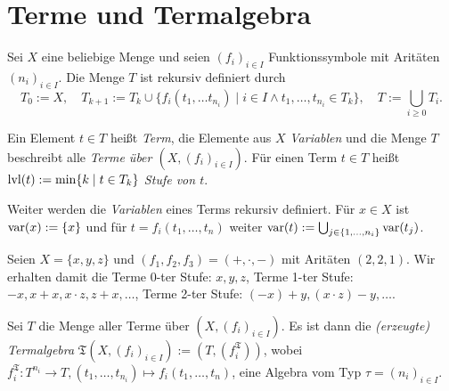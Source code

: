 \section{Terme und Termalgebra}

\begin{definition}
    Sei $X$ eine beliebige Menge und seien $(f_i)_{i \in I}$ Funktionssymbole mit Aritäten $(n_i)_{i \in I}$. Die Menge $T$ ist rekursiv definiert durch $$T_0 := X ,\quad T_{k+1} := T_k \cup \{f_i(t_1, \ldots t_{n_i}) \;\vert\; i \in I \land t_1, \ldots, t_{n_i} \in T_k\},\quad T := \bigcup_{i \ge 0} T_i.$$ 
    
    Ein Element $t \in T$ heißt \emph{Term}, die Elemente aus $X$ \emph{Variablen} und die Menge $T$ beschreibt alle \emph{Terme über $(X, (f_i)_{i \in I})$}.
    Für einen Term $t \in T$ heißt $\operatorname{lvl}(t) := \min\{k \;\vert\; t \in T_k\}$ \emph{Stufe von $t$}. 
    
    Weiter werden die \emph{Variablen} eines Terms rekursiv definiert. Für $x \in X$ ist $\operatorname{var}(x) := \{x\}$ und für $t = f_i(t_1, \ldots, t_n)$ weiter $\operatorname{var}(t) := \bigcup_{j \in \{1, \ldots, n_i\}} \operatorname{var}(t_j)$.
\end{definition}

\begin{example}
    Seien $X = \{x,y,z\}$ und $(f_1, f_2, f_3) = (+, \cdot, -)$ mit Aritäten $(2,2,1)$. Wir erhalten damit die Terme 0-ter Stufe: $x, y, z$, Terme 1-ter Stufe: $-x, x+x, x\cdot z, z + x, \ldots$, Terme 2-ter Stufe: $(-x) + y, (x \cdot z) - y, \ldots$.
\end{example}

\begin{definition}
    Sei $T$ die Menge aller Terme über $(X, (f_i)_{i \in I})$. Es ist dann die \emph{(erzeugte) Termalgebra} $\mathfrak{T}(X, (f_i)_{i \in I}) := (T, (f_i^\mathfrak{T}))$, wobei $f_i^\mathfrak{T}: T^{n_i} \to T, (t_1, \ldots, t_{n_i}) \mapsto f_i(t_1, \ldots, t_n)$, eine Algebra vom Typ $\tau = (n_i)_{i \in I}$.
\end{definition}

